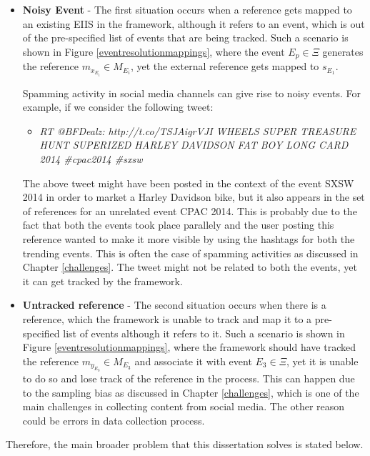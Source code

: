 \begin{itemize}
\item \textbf{Noisy Event} - The first situation occurs when a reference gets mapped to an existing EIIS in the framework, although it refers to an event, which is out of the pre-specified list of events that are being tracked. Such a scenario is shown in Figure \ref{eventresolutionmappings}, where the event $E_{p} \in \Xi$ generates the reference $m_{x_{E_{i}}} \in M_{E_{i}}$, yet the external reference gets mapped to $s_{E_{1}}$. 

Spamming activity in social media channels can give rise to noisy events. For example, if we consider the following tweet:

\begin{itemize}
\item \textit{RT @BFDealz: http://t.co/TSJAigrVJI WHEELS SUPER TREASURE HUNT SUPERIZED HARLEY DAVIDSON FAT BOY LONG CARD 2014 \#cpac2014 \#sxsw}
\end{itemize}

The above tweet might have been posted in the context of the event SXSW 2014 in order to market a Harley Davidson bike, but it also appears in the set of references for an unrelated event CPAC 2014. This is probably due to the fact that both the events took place parallely and the user posting this reference wanted to make it more visible by using the hashtags for both the trending events. This is often the case of spamming activities as discussed in Chapter \ref{challenges}. The tweet might not be related to both the events, yet it can get tracked by the framework.


\item \textbf{Untracked reference} - The second situation occurs when there is a reference, which the framework is unable to track and map it to a pre-specified list of events although it refers to it. Such a scenario is shown in Figure \ref{eventresolutionmappings}, where the framework should have tracked the reference $m_{y_{E_{3}}} \in M_{E_{3}}$ and associate it with event $E_{3} \in \Xi $, yet it is unable to do so and lose track of the reference in the process. This can happen due to the sampling bias as discussed in Chapter \ref{challenges}, which is one of the main challenges in collecting content from social media. The other reason could be errors in data collection process.

\end{itemize}

Therefore, the main broader problem that this dissertation solves is stated below.



